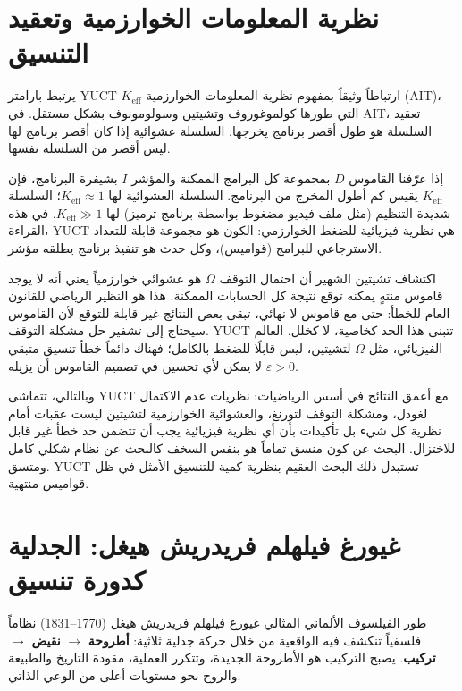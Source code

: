 \documentclass[12pt,a4paper]{article}
\begin{document}
	\section{نظرية المعلومات الخوارزمية وتعقيد التنسيق}
	
	يرتبط بارامتر YUCT \(K_{\mathrm{eff}}\) ارتباطاً وثيقاً بمفهوم نظرية المعلومات الخوارزمية (AIT)، التي طورها كولموغوروف وتشيتين وسولومونوف بشكل مستقل. في AIT، تعقيد السلسلة هو طول أقصر برنامج يخرجها. السلسلة عشوائية إذا كان أقصر برنامج لها ليس أقصر من السلسلة نفسها.
	
	إذا عرّفنا القاموس \(D\) بمجموعة كل البرامج الممكنة والمؤشر \(I\) بشيفرة البرنامج، فإن \(K_{\mathrm{eff}}\) يقيس كم أطول المخرج من البرنامج. السلسلة العشوائية لها \(K_{\mathrm{eff}} \approx 1\)؛ السلسلة شديدة التنظيم (مثل ملف فيديو مضغوط بواسطة برنامج ترميز) لها \(K_{\mathrm{eff}} \gg 1\). في هذه القراءة، YUCT هي نظرية فيزيائية للضغط الخوارزمي: الكون هو مجموعة قابلة للتعداد الاسترجاعي للبرامج (قواميس)، وكل حدث هو تنفيذ برنامج يطلقه مؤشر.
	
	اكتشاف تشيتين الشهير أن احتمال التوقف \(\Omega\) هو عشوائي خوارزمياً يعني أنه لا يوجد قاموس منتهٍ يمكنه توقع نتيجة كل الحسابات الممكنة. هذا هو النظير الرياضي للقانون العام للخطأ: حتى مع قاموس لا نهائي، تبقى بعض النتائج غير قابلة للتوقع لأن القاموس سيحتاج إلى تشفير حل مشكلة التوقف. YUCT تتبنى هذا الحد كخاصية، لا كخلل. العالم الفيزيائي، مثل \(\Omega\) لتشيتين، ليس قابلًا للضغط بالكامل؛ فهناك دائماً خطأ تنسيق متبقي \(\varepsilon > 0\) لا يمكن لأي تحسين في تصميم القاموس أن يزيله.
	
	وبالتالي، تتماشى YUCT مع أعمق النتائج في أسس الرياضيات: نظريات عدم الاكتمال لغودل، ومشكلة التوقف لتورنغ، والعشوائية الخوارزمية لتشيتين ليست عقبات أمام نظرية كل شيء بل تأكيدات بأن أي نظرية فيزيائية يجب أن تتضمن حد خطأ غير قابل للاختزال. البحث عن كون منسق تماماً هو بنفس السخف كالبحث عن نظام شكلي كامل ومتسق. YUCT تستبدل ذلك البحث العقيم بنظرية كمية للتنسيق الأمثل في ظل قواميس منتهية.
	
	\section{غيورغ فيلهلم فريدريش هيغل: الجدلية كدورة تنسيق}
	
	طور الفيلسوف الألماني المثالي غيورغ فيلهلم فريدريش هيغل (1770–1831) نظاماً فلسفياً تنكشف فيه الواقعية من خلال حركة جدلية ثلاثية: \textbf{أطروحة} \(\to\) \textbf{نقيض} \(\to\) \textbf{تركيب}. يصبح التركيب هو الأطروحة الجديدة، وتتكرر العملية، مقودة التاريخ والطبيعة والروح نحو مستويات أعلى من الوعي الذاتي.
	
\end{document}
